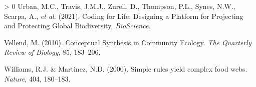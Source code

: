 \documentclass[11pt]{article}
\newlength{\cslhangindent}
\newenvironment{CSLReferences}[3] %
 {%
  \setlength{\parindent}{0pt}
  \ifodd #1 \everypar{\setlength{\hangindent}{\cslhangindent}}\ignorespaces\fi
  \ifnum #2 > 0
  \setlength{\parskip}{#2\baselineskip}
  \fi
 }%
 {}
\begin{document}
\begin{CSLReferences}{1}{0}
\leavevmode\hypertarget{ref-Urban2021CodLif}{}%
Urban, M.C., Travis, J.M.J., Zurell, D., Thompson, P.L., Synes, N.W.,
Scarpa, A., \emph{et al.} (2021). Coding for Life: Designing a Platform
for Projecting and Protecting Global Biodiversity. \emph{BioScience}.

\leavevmode\hypertarget{ref-Vellend2010ConSyn}{}%
Vellend, M. (2010). Conceptual Synthesis in Community Ecology. \emph{The
Quarterly Review of Biology}, 85, 183--206.

\leavevmode\hypertarget{ref-Williams2000SimRul}{}%
Williams, R.J. \& Martinez, N.D. (2000). Simple rules yield complex food
webs. \emph{Nature}, 404, 180--183.

\end{CSLReferences}
\end{document}
